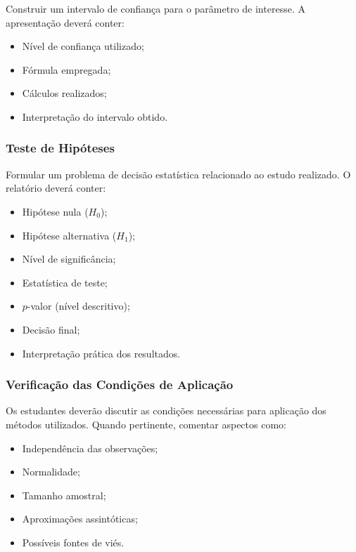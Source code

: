 \documentclass[
  letterpaper,
  DIV=11,
  numbers=noendperiod]{scrreprt}
\providecommand{\tightlist}{%
  \setlength{\itemsep}{0pt}\setlength{\parskip}{0pt}}\usepackage{longtable,booktabs,array}
\begin{document}
Construir um intervalo de confiança para o parâmetro de interesse. A
apresentação deverá conter:

\begin{itemize}
\tightlist
\item
  Nível de confiança utilizado;
\item
  Fórmula empregada;
\item
  Cálculos realizados;
\item
  Interpretação do intervalo obtido.
\end{itemize}

\subsubsection{Teste de Hipóteses}\label{teste-de-hipuxf3teses}

Formular um problema de decisão estatística relacionado ao estudo
realizado. O relatório deverá conter:

\begin{itemize}
\tightlist
\item
  Hipótese nula (\(H_0\));
\item
  Hipótese alternativa (\(H_1\));
\item
  Nível de significância;
\item
  Estatística de teste;
\item
  \(p\)-valor (nível descritivo);
\item
  Decisão final;
\item
  Interpretação prática dos resultados.
\end{itemize}

\subsubsection{Verificação das Condições de
Aplicação}\label{verificauxe7uxe3o-das-condiuxe7uxf5es-de-aplicauxe7uxe3o}

Os estudantes deverão discutir as condições necessárias para aplicação
dos métodos utilizados. Quando pertinente, comentar aspectos como:

\begin{itemize}
\tightlist
\item
  Independência das observações;
\item
  Normalidade;
\item
  Tamanho amostral;
\item
  Aproximações assintóticas;
\item
  Possíveis fontes de viés.
\end{itemize}
\end{document}
